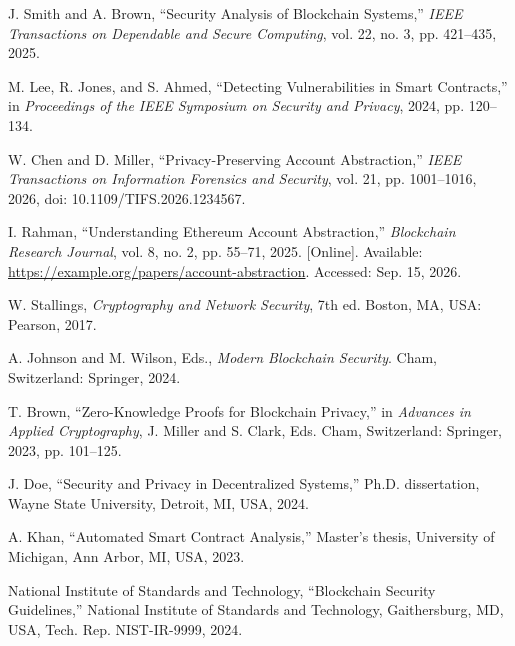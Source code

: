 %
%

J. Smith and A. Brown, ``Security Analysis of Blockchain Systems,'' \emph{IEEE Transactions on Dependable and Secure Computing}, vol. 22, no. 3, pp. 421--435, 2025.

M. Lee, R. Jones, and S. Ahmed, ``Detecting Vulnerabilities in Smart Contracts,'' in \emph{Proceedings of the IEEE Symposium on Security and Privacy}, 2024, pp. 120--134.

W. Chen and D. Miller, ``Privacy-Preserving Account Abstraction,'' \emph{IEEE Transactions on Information Forensics and Security}, vol. 21, pp. 1001--1016, 2026, doi: 10.1109/TIFS.2026.1234567.

I. Rahman, ``Understanding {Ethereum} Account Abstraction,'' \emph{Blockchain Research Journal}, vol. 8, no. 2, pp. 55--71, 2025. [Online]. Available: \url{https://example.org/papers/account-abstraction}. Accessed: Sep. 15, 2026.

W. Stallings, \emph{Cryptography and Network Security}, 7th ed. Boston, MA, USA: Pearson, 2017.

A. Johnson and M. Wilson, Eds., \emph{Modern Blockchain Security}. Cham, Switzerland: Springer, 2024.

T. Brown, ``Zero-Knowledge Proofs for Blockchain Privacy,'' in \emph{Advances in Applied Cryptography}, J. Miller and S. Clark, Eds. Cham, Switzerland: Springer, 2023, pp. 101--125.

J. Doe, ``Security and Privacy in Decentralized Systems,'' Ph.D. dissertation, Wayne State University, Detroit, MI, USA, 2024.

A. Khan, ``Automated Smart Contract Analysis,'' Master's thesis, University of Michigan, Ann Arbor, MI, USA, 2023.

National Institute of Standards and Technology, ``Blockchain Security Guidelines,'' National Institute of Standards and Technology, Gaithersburg, MD, USA, Tech. Rep. NIST-IR-9999, 2024.


